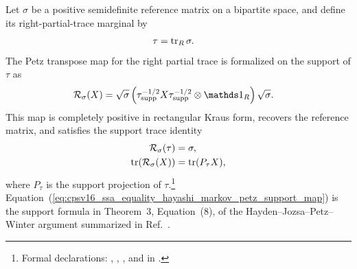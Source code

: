 \documentclass[11pt]{article}
\begin{document}
Let $\sigma$ be a positive semidefinite reference matrix on a bipartite space,
and define its right-partial-trace marginal by
\begin{align}
    \tau
        &=\operatorname{tr}_R\sigma.
    \label{eq:cpsv16_ssa_equality_hayashi_markov_reference_marginal}
\end{align}
The Petz transpose map for the right partial trace is formalized on the support
of $\tau$ as
\begin{align}
    \mathcal R_\sigma(X)
        &=
        \sqrt{\sigma}
        \left(\tau^{-1/2}_{\mathrm{supp}}
            X
            \tau^{-1/2}_{\mathrm{supp}}
            \otimes\Id_R\right)
        \sqrt{\sigma}.
    \label{eq:cpsv16_ssa_equality_hayashi_markov_petz_support_map}
\end{align}
This map is completely positive in rectangular Kraus form, recovers the
reference matrix, and satisfies the support trace identity
\begin{align}
    \mathcal R_\sigma(\tau)
        &=\sigma,
    \label{eq:cpsv16_ssa_equality_hayashi_markov_petz_reference_recovery}\\
    \operatorname{tr}\!\left(\mathcal R_\sigma(X)\right)
        &=\operatorname{tr}(P_\tau X),
    \label{eq:cpsv16_ssa_equality_hayashi_markov_petz_support_trace}
\end{align}
where $P_\tau$ is the support projection of $\tau$.\footnote{Formal
declarations:
,
,
, and
 in
.}
Equation~(\ref{eq:cpsv16_ssa_equality_hayashi_markov_petz_support_map}) is the
support formula in Theorem~3, Equation~(8), of the
Hayden--Jozsa--Petz--Winter argument summarized in
Ref.~\cite{Cirac2021Matrix}.
\end{document}
